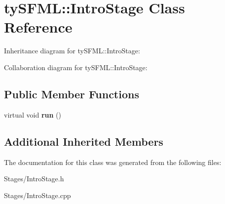 \hypertarget{classty_s_f_m_l_1_1_intro_stage}{}\section{ty\+S\+F\+M\+L\+:\+:Intro\+Stage Class Reference}
\label{classty_s_f_m_l_1_1_intro_stage}


Inheritance diagram for ty\+S\+F\+M\+L\+:\+:Intro\+Stage\+:


Collaboration diagram for ty\+S\+F\+M\+L\+:\+:Intro\+Stage\+:
\subsection*{Public Member Functions}
\begin{DoxyCompactItemize}
\item 
\hypertarget{classty_s_f_m_l_1_1_intro_stage_a920fd7bdc20154a5e6db82364ea507ca}{}virtual void {\bfseries run} ()\label{classty_s_f_m_l_1_1_intro_stage_a920fd7bdc20154a5e6db82364ea507ca}

\end{DoxyCompactItemize}
\subsection*{Additional Inherited Members}


The documentation for this class was generated from the following files\+:\begin{DoxyCompactItemize}
\item 
Stages/Intro\+Stage.\+h\item 
Stages/Intro\+Stage.\+cpp\end{DoxyCompactItemize}
